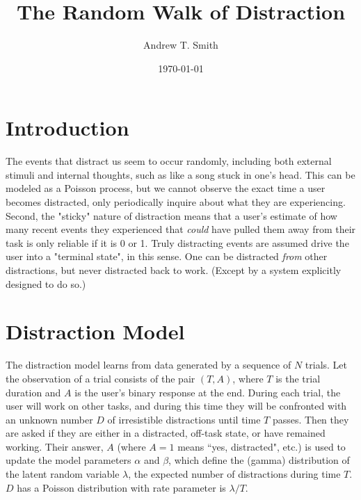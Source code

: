 \documentclass{article}
\begin{document}
\title{The Random Walk of Distraction}
\author{Andrew T. Smith}
\date{\today}
\maketitle

\section{Introduction}
The events that distract us seem to occur randomly, including both external stimuli and internal thoughts, such as like a song stuck in one's head.   This can be modeled as a Poisson process, but we cannot observe the exact time a user becomes distracted, only periodically inquire about what they are experiencing.  Second, the "sticky" nature of distraction means that a user's estimate of how many recent events they experienced that \emph{could} have pulled them away from their task is only reliable if it is 0 or 1.  Truly distracting events are assumed drive the user into a "terminal state", in this sense. One can be distracted \emph{from} other distractions, but never distracted back to work.  (Except by a system explicitly designed to do so.)

\section{Distraction Model}
The distraction model learns from data generated by a sequence of $N$ trials.  Let the observation of a trial consists of the pair $(T, A)$, where $T$ is the trial duration and $A$ is the user's binary response at the end.  During each trial, the user will work on other tasks, and during this time they will be confronted with an unknown number $D$ of irresistible distractions until time $T$ passes. Then they are asked if they are either in a distracted, off-task state, or have remained working.  Their answer, $A$ (where $A=1$ means ``yes, distracted", etc.) is used to update the model parameters $\alpha$ and $\beta$, which define the (gamma) distribution of the latent random variable  $\lambda$, the expected number of distractions during time $T$.  $D$ has a Poisson distribution with rate parameter is $\lambda/T$.
\renewcommand{\arraystretch}{1.2}
\newcommand{\poisson}{{\rm Pr}}
\newcommand{\exponential}{{\rm Exp}}

\begin{minipage}{\linewidth}
	\centering
\end{minipage}\\\\
\end{document}
